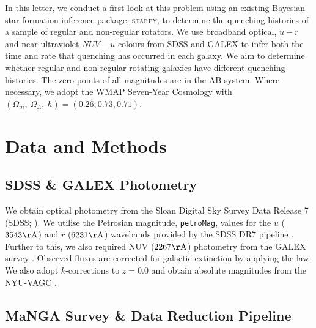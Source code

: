 \documentclass[useAMS,usenatbib]{mn2e}
\begin{document}
In this letter, we conduct a first look at this problem using an existing Bayesian star formation inference package, \textsc{starpy}, to determine the quenching histories of a sample of regular and non-regular rotators. We use broadband optical, $u-r$ and near-ultraviolet $NUV-u$ colours from SDSS and GALEX to infer both the time and rate that quenching has occurred in each galaxy. We aim to determine whether regular and non-regular rotating galaxies have different quenching histories. 
The zero points of all magnitudes are in the AB system. Where necessary, we adopt the WMAP Seven-Year Cosmology \citep{jarosik11} with $(\Omega_m , ~\Omega_\Lambda , ~h) = (0.26, 0.73, 0.71)$.



\section{Data and Methods}\label{sec:datamethods}

\subsection{SDSS \& GALEX Photometry}\label{sec:photom}

We obtain optical photometry from the Sloan Digital Sky Survey Data Release 7 (SDSS; \citealt{york00, abazajian09}). We utilise the Petrosian magnitude, {\tt petroMag}, values for the $u$ ($3543 \rm{\AA}$) and $r$ ($6231 \rm{\AA}$) wavebands provided by the SDSS DR7 pipeline \citep{stoughton02}. Further to this, we also required NUV ($2267 \rm{\AA}$) photometry from the GALEX survey \citep{martin05}. Observed fluxes are corrected for galactic extinction \citep{Oh11} by applying the \citet*{Cardelli89} law. We also adopt $k$-corrections to $z = 0.0$ and obtain absolute magnitudes from the NYU-VAGC \citep{blanton05, padmanabhan08, blanton07}.

\subsection{MaNGA Survey \& Data Reduction Pipeline}\label{sec:manga}
\end{document}

